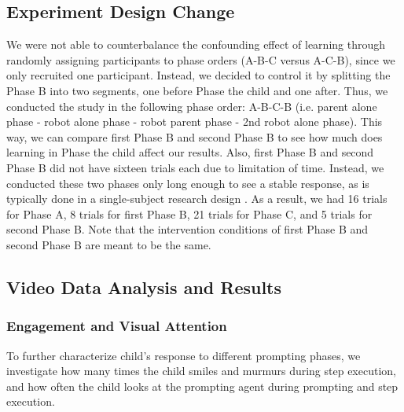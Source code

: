 \subsection{Experiment Design Change}
We were not able to counterbalance the confounding effect of learning through randomly assigning participants to phase orders (A-B-C versus A-C-B), since we only recruited one participant.  Instead, we decided to control it by splitting the Phase B into two segments, one before Phase the child and one after.  Thus, we conducted the study in the following phase order: A-B-C-B (i.e. parent alone phase - robot alone phase - robot parent phase - 2nd robot alone phase).  This way, we can compare first Phase B and second Phase B to see how much does learning in Phase the child affect our results.  Also, first Phase B and second Phase B did not have sixteen trials each due to limitation of time.  Instead, we conducted these two phases only long enough to see a stable response, as is typically done in a single-subject research design \cite{ayres2009acquisition, bereznak2012video}.  As a result, we had 16 trials for Phase A, 8 trials for first Phase B, 21 trials for Phase C, and 5 trials for second Phase B.  Note that the intervention conditions of first Phase B and second Phase B are meant to be the same.


\subsection{Video Data Analysis and Results}
\label{sec:VideoDataAnalysisAndResults}


\subsubsection{Engagement and Visual Attention}
To further characterize child's response to different prompting phases, we investigate how many times the child smiles and murmurs during step execution, and how often the child looks at the prompting agent during prompting and step execution.

